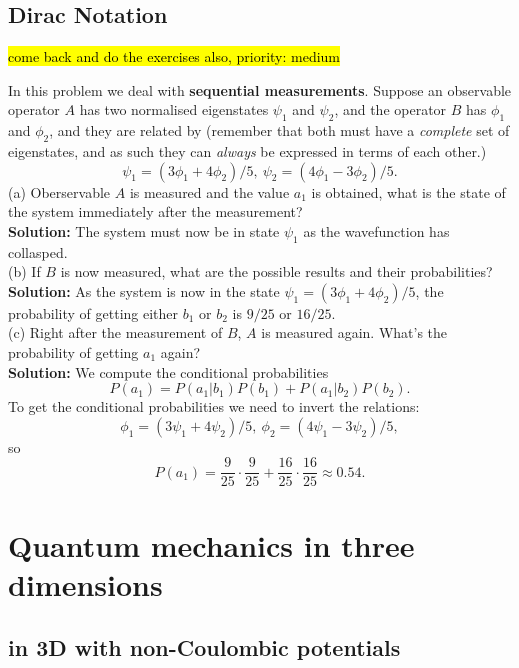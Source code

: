 \subsection{Dirac Notation}
\hl{come back and do the exercises also, priority: medium}
\begin{wex}
In this problem we deal with \textbf{sequential measurements}. 
Suppose an observable operator $A$ has two normalised eigenstates 
$\psi_1$ and $\psi_2$, and the operator $B$ has $\phi_1$ and $\phi_2$, and they are related by 
(remember that both must have a \textit{complete} set of eigenstates, and as such they can \textit{always} 
be expressed in terms of each other.)
\begin{equation}
\psi_1=(3\phi_1+4\phi_2)/5,\ \psi_2=(4\phi_1-3\phi_2)/5. 
\end{equation}
(a) Oberservable $A$ is measured and the value $a_1$ is obtained, what is the 
state of the system immediately after the measurement? \\
\textbf{Solution: }The system must now be in state $\psi_1$ as the wavefunction has collasped. \\
(b) If $B$ is now measured, what are the possible results and their probabilities? \\
\textbf{Solution: }As the system is now in the state $\psi_1=(3\phi_1+4\phi_2)/5$, 
the probability of getting either $b_1$ or $b_2$ is $9/25$ or $16/25$. \\
(c) Right after the measurement of $B$, $A$ is measured again. What's the 
probability of getting $a_1$ again?\\
\textbf{Solution: }We compute the conditional probabilities
\begin{equation}
P(a_1)=P(a_1|b_1)P(b_1)+P(a_1|b_2)P(b_2). 
\end{equation}
To get the conditional probabilities we need to invert the relations: 
\begin{equation}
\phi_1=(3\psi_1+4\psi_2)/5,\ \phi_2=(4\psi_1-3\psi_2)/5, 
\end{equation}
so 
\begin{equation}
P(a_1)=\frac{9}{25}\cdot\frac{9}{25}+\frac{16}{25}\cdot\frac{16}{25}\approx0.54. 
\end{equation}

\end{wex}
\section{Quantum mechanics in three dimensions}
\subsection{\sch in 3D with non-Coulombic potentials}
